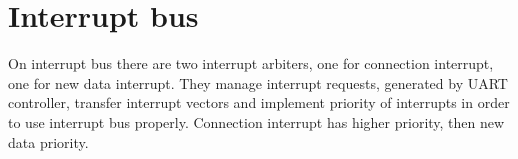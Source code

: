 \section*{Interrupt bus}

On interrupt bus there are two interrupt arbiters, one for connection interrupt, one for new data interrupt. They manage interrupt requests, generated by UART controller, transfer interrupt vectors and implement priority of interrupts in order to use interrupt bus properly. Connection interrupt has higher priority, then new data priority.
